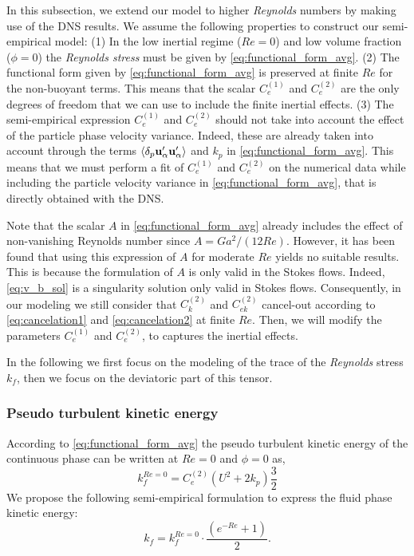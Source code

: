 In this subsection, we extend our model to higher \textit{Reynolds} numbers by making use of the DNS results. 
We assume the following properties to construct our semi-empirical model: 
(1) In the low inertial regime ($Re=0$) and low volume fraction ($\phi=0$) the \textit{Reynolds stress} must be given by  \ref{eq:functional_form_avg}. 
(2) The functional form given by \ref{eq:functional_form_avg} is preserved at finite $Re$ for the non-buoyant terms. 
This means that the scalar $C_e^{(1)}$ and $C_e^{(2)}$ are the only degrees of freedom that we can use to include the finite inertial effects. 
(3) The semi-empirical expression  $C_e^{(1)}$ and $C_e^{(2)}$ should not take into account the effect of the particle phase velocity variance. 
Indeed, these are already taken into account through the terms $\left<\delta_p \textbf{u}_\alpha'\textbf{u}_\alpha'\right>$ and $k_p$ in \ref{eq:functional_form_avg}. 
This means that we must perform a fit of $C_e^{(1)}$ and $C_e^{(2)}$ on the numerical data while including the particle velocity variance in \ref{eq:functional_form_avg}, that is directly obtained with the DNS.

Note that the scalar $A$ in \ref{eq:functional_form_avg} already includes the effect of non-vanishing Reynolds number since $A = Ga^2 /(12 Re)$. 
However, it has been found that using this expression of $A$ for moderate $Re$ yields no suitable results. 
This is because the formulation of $A$ is only valid in the Stokes flows. 
Indeed, \ref{eq:v_b_sol} is a singularity solution only valid in Stokes flows. 
Consequently, in our modeling we still consider that $C_k^{(2)}$ and $C_{ek}^{(2)}$ cancel-out according to \ref{eq:cancelation1} and \ref{eq:cancelation2} at finite $Re$. 
Then, we will modify the parameters $C_e^{(1)}$ and $C_e^{(2)}$,  to captures the inertial effects. 

In the following we first focus on the modeling of the trace of the \textit{Reynolds} stress $k_f$, then we focus on the deviatoric part of this tensor. 

\subsubsection{Pseudo turbulent kinetic energy}

According to \ref{eq:functional_form_avg} the pseudo turbulent kinetic energy of the continuous phase can be written at $Re = 0$ and $\phi = 0$ as,
\begin{equation}
    k_f^{Re = 0}
    = 
    C_e^{(2)}  \left( U^2 + 2 k_p\right)  \frac{3}{2}
    \label{eq:TKE}
\end{equation}
We propose the following semi-empirical formulation to express the fluid phase kinetic energy: 
\begin{equation}
    k_f
    = 
    k_f^{Re = 0}
    \cdot \frac{\left(e^{-Re} +1\right)}{2}.
    \label{eq:semi_empirical}
\end{equation}


